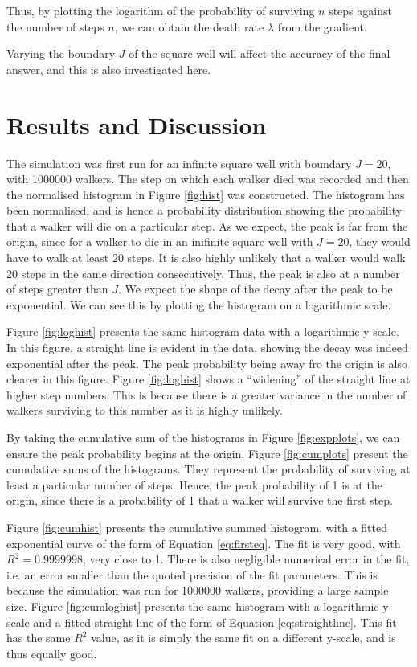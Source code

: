 \documentclass[journal]{IEEEtran}
\begin{document}
Thus, by plotting the logarithm of the probability of surviving $n$ steps
against the number of steps $n$, we can obtain the death rate $\lambda$ from the
gradient.

Varying the boundary $J$ of the square well will affect the accuracy of the
final answer, and this is also investigated here.


\section{Results and Discussion}
The simulation was first run for an infinite square well with boundary $J = 20$,
with 1000000 walkers. The step on which each walker died was recorded and then
the normalised histogram in Figure \ref{fig:hist} was constructed. The histogram
has been normalised, and is hence a probability distribution showing the
probability that a walker will die on a particular step. As we expect, the peak
is far from the origin, since for a walker to die in an inifinite square well
with $J=20$, they would have to walk at least 20 steps. It is also highly
unlikely that a walker would walk 20 steps in the same direction
consecutively. Thus, the peak is also at a number of steps greater than $J$. We
expect the shape of the decay after the peak to be exponential. We can see this
by plotting the histogram on a logarithmic scale.

Figure \ref{fig:loghist} presents the same histogram data with a logarithmic y
scale. In this figure, a straight line is evident in the data, showing the decay
was indeed exponential after the peak. The peak probability being away fro the
origin is also clearer in this figure. Figure \ref{fig:loghist} shows a
``widening'' of the straight line at higher step numbers. This is because there
is a greater variance in the number of walkers surviving to this number as it is
highly unlikely. 

By taking the cumulative sum of the histograms in Figure \ref{fig:expplots}, we
can ensure the peak probability begins at the origin. Figure \ref{fig:cumplots}
present the cumulative sums of the histograms. They represent the probability of
surviving at least a particular number of steps. Hence, the peak probability of
1 is at the origin, since there is a probability of 1 that a walker will survive
the first step.

Figure \ref{fig:cumhist} presents the cumulative summed histogram, with a fitted
exponential curve of the form of Equation \ref{eq:firsteq}. The fit is very
good, with $R^2 = 0.9999998$, very close to 1. There is also negligible
numerical error in the fit, i.e. an error smaller than the quoted precision of
the fit parameters. This is because the simulation was run for 1000000 walkers,
providing a large sample size. Figure \ref{fig:cumloghist} presents the same
histogram with a logarithmic y-scale and a fitted straight line of the form of
Equation \ref{eq:straightline}. This fit has the same $R^2$ value, as it is
simply the same fit on a different y-scale, and is thus equally good.
\end{document}

